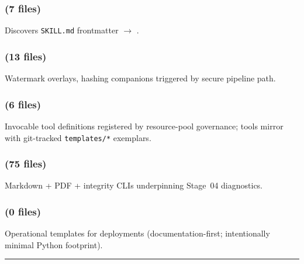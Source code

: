 \documentclass[
  english,
]{article}
\begin{document}
\subsubsection{\texorpdfstring{ (7
files)}{infrastructure.skills (7 files)}}\label{infrastructure.skills-7-files}

Discovers \texttt{SKILL.md} frontmatter \texorpdfstring{\ensuremath{\to}}{->}
.

\subsubsection{\texorpdfstring{ (13
files)}{infrastructure.steganography (13 files)}}\label{infrastructure.steganography-13-files}

Watermark overlays, hashing companions triggered by secure pipeline
path.

\subsubsection{\texorpdfstring{ (6
files)}{infrastructure.tools (6 files)}}\label{infrastructure.tools-6-files}

Invocable tool definitions registered by resource-pool governance; tools
mirror  with git-tracked
\texttt{templates/*} exemplars.

\subsubsection{\texorpdfstring{ (75
files)}{infrastructure.validation (75 files)}}\label{infrastructure.validation-75-files}

Markdown + PDF + integrity CLIs underpinning Stage~04 diagnostics.

\subsubsection{\texorpdfstring{ (0
files)}{infrastructure/logrotate.d (0 files)}}\label{infrastructurelogrotate.d-0-files}

Operational templates for deployments (documentation-first;
intentionally minimal Python footprint).

\begin{center}\rule{0.5\linewidth}{0.5pt}\end{center}
\end{document}
